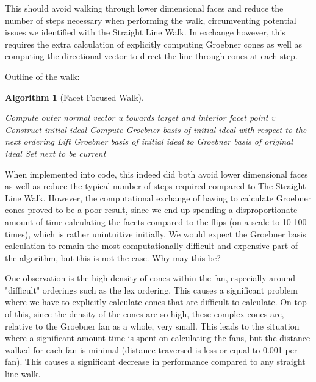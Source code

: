 \documentclass[12pt,a4paper]{report}
\newtheorem{algorithm}{Algorithm}
\begin{document}
This should avoid walking through lower dimensional faces and reduce the number of steps necessary when performing the walk, circumventing potential issues we identified with the Straight Line Walk. In exchange however, this requires the extra calculation of explicitly computing Groebner cones as well as computing the directional vector to direct the line through cones at each step.

Outline of the walk:

\begin{algorithm}[Facet Focused Walk]\
 \begin{algorithmic}[1]
    \ENSURE{Reduced Groebner basis for I over $\prec_{2}$.}
    \STATE Compute outer normal vector u towards target and interior facet point v
    \STATE Construct initial ideal
    \STATE Compute Groebner basis of initial ideal with respect to the next ordering
    \STATE Lift Groebner basis of initial ideal to Groebner basis of original ideal
    \STATE Set next to be current
\end{algorithmic}
\end{algorithm}

When implemented into code, this indeed did both avoid lower dimensional faces as well as reduce the typical number of steps required compared to The Straight Line Walk. However, the computational exchange of having to calculate Groebner cones proved to be a poor result, since we end up spending a disproportionate amount of time calculating the facets compared to the flips (on a scale to 10-100 times), which is rather unintuitive initially. We would expect the Groebner basis calculation to remain the most computationally difficult and expensive part of the algorithm, but this is not the case. Why may this be?

One observation is the high density of cones within the fan, especially around "difficult" orderings such as the lex ordering. This causes a significant problem where we have to explicitly calculate cones that are difficult to calculate. On top of this, since the density of the cones are so high, these complex cones are, relative to the Groebner fan as a whole, very small. This leads to the situation where a significant amount time is spent on calculating the fans, but the distance walked for each fan is minimal (distance traversed is less or equal to 0.001 per fan). This causes a significant decrease in performance compared to any straight line walk.
\end{document}
